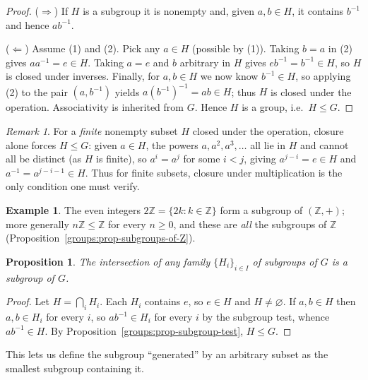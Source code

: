 \documentclass[11pt,a4paper]{article}
\newtheorem{proposition}[theorem]{Proposition}
\theoremstyle{definition}
\newtheorem{example}[theorem]{Example}
\theoremstyle{remark}
\newtheorem{remark}[theorem]{Remark}
\newcommand{\Z}{\ensuremath{\mathbb{Z}}}
\begin{document}
\begin{proof}
($\Rightarrow$) If \(H\) is a subgroup it is nonempty and, given \(a,b \in H\), it contains \(b^{-1}\) and hence \(ab^{-1}\).

($\Leftarrow$) Assume (1) and (2). Pick any \(a \in H\) (possible by (1)). Taking \(b = a\) in (2) gives \(a a^{-1} = e \in H\). Taking \(a = e\) and \(b\) arbitrary in \(H\) gives \(e b^{-1} = b^{-1} \in H\), so \(H\) is closed under inverses. Finally, for \(a,b \in H\) we now know \(b^{-1} \in H\), so applying (2) to the pair \((a, b^{-1})\) yields \(a (b^{-1})^{-1} = ab \in H\); thus \(H\) is closed under the operation. Associativity is inherited from \(G\). Hence \(H\) is a group, i.e.\ \(H \le G\).
\end{proof}

\begin{remark}\label{groups:rem-finite-test}
For a \emph{finite} nonempty subset \(H\) closed under the operation, closure alone forces \(H \le G\): given \(a \in H\), the powers \(a, a^2, a^3, \dots\) all lie in \(H\) and cannot all be distinct (as \(H\) is finite), so \(a^i = a^j\) for some \(i<j\), giving \(a^{j-i} = e \in H\) and \(a^{-1} = a^{j-i-1} \in H\). Thus for finite subsets, closure under multiplication is the only condition one must verify.
\end{remark}

\begin{example}\label{groups:exa-subgroups}
The even integers \(2\Z = \{2k : k \in \Z\}\) form a subgroup of \((\Z,+)\); more generally \(n\Z \le \Z\) for every \(n \ge 0\), and these are \emph{all} the subgroups of \(\Z\) (Proposition~\ref{groups:prop-subgroups-of-Z}).
\end{example}

\begin{proposition}\label{groups:prop-intersection}
The intersection of any family \(\{H_i\}_{i \in I}\) of subgroups of \(G\) is a subgroup of \(G\).
\end{proposition}

\begin{proof}
Let \(H = \bigcap_i H_i\). Each \(H_i\) contains \(e\), so \(e \in H\) and \(H \neq \varnothing\). If \(a,b \in H\) then \(a,b \in H_i\) for every \(i\), so \(ab^{-1} \in H_i\) for every \(i\) by the subgroup test, whence \(ab^{-1} \in H\). By Proposition~\ref{groups:prop-subgroup-test}, \(H \le G\).
\end{proof}

This lets us define the subgroup ``generated'' by an arbitrary subset as the smallest subgroup containing it.
\end{document}
